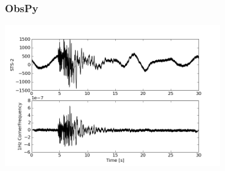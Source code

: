 \documentclass[t,10pt,compress=false,usepdftitle=false]{beamer}
\begin{document}
%


\begin{frame}[fragile]
    \frametitle{ObsPy}
    \begin{center}
      \includegraphics[width=0.7\textwidth]{arclink.png}
    \end{center}
\end{frame}
\end{document}
